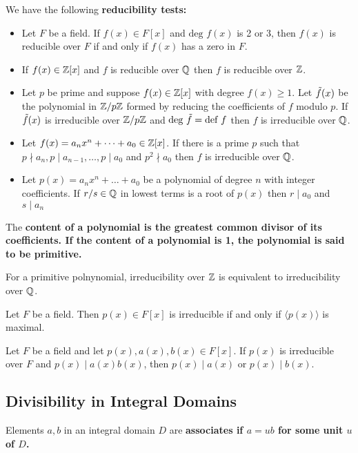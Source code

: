 \documentclass{hmwk}
\begin{document}
\begin{prop}
We have the following \bf{reducibility tests}:
\begin{itemize}
    \item Let $F$ be a field. If $f(x) \in F[x]$ and $\text{deg } f(x)$ is 2 or 3, then $f(x)$ is reducible over $F$ if and only if $f(x)$ has a zero in $F$.
    \item If $f(x) \in \mathbb{Z}[x]$ and $f$ is reducible over $\mathbb{Q}$ then $f$ is reducible over $\mathbb{Z}$.
    \item Let $p$ be prime and suppose $f(x) \in \mathbb{Z}[x]$ with degree $f(x) \geq 1$. Let $\Tilde{f}(x)$ be the polynomial in $\mathbb{Z}/p\mathbb{Z}$ formed by reducing the coefficients of $f$ modulo $p$. If $\Tilde{f}(x)$ is irreducible over $\mathbb{Z}/p\mathbb{Z}$ and $\text{deg }\Tilde{f} = \text{def }f$ then $f$ is irreducible over $\mathbb{Q}$.
    \item Let $f(x) = a_nx^n + \dots + a_0 \in \mathbb{Z}[x]$. If there is a prime $p$ such that $p \nmid a_n, p \mid a_{n-1}, \dots, p \mid a_0$ and $p^2 \nmid a_0$ then $f$ is irreducible over $\mathbb{Q}$. 
    \item Let $p(x) = a_nx^n + \dots + a_0$ be a polynomial of degree $n$ with integer coefficients. If $r/s \in \mathbb{Q}$ in lowest terms is a root of $p(x)$ then $r \mid a_0$ and $s \mid a_n$
\end{itemize}
\end{prop}

\begin{defn}
The \bf{content} of a polynomial is the greatest common divisor of its coefficients. If the content of a polynomial is 1, the polynomial is said to be primitive. 
\end{defn}

\begin{prop}
For a primitive polnynomial, irreducibility over $\mathbb{Z}$ is equivalent to irreducibility over $\mathbb{Q}$.
\end{prop}

\begin{prop}
Let $F$ be a field. Then $p(x) \in F[x]$ is irreducible if and only if $\langle p(x)\rangle$ is maximal. 
\end{prop}

\begin{prop}
Let $F$ be a field and let $p(x), a(x), b(x) \in F[x]$. If $p(x)$ is irreducible over $F$ and $p(x) \mid a(x)b(x)$, then $p(x) \mid a(x)$ or $p(x) \mid b(x)$.
\end{prop}

\subsection{Divisibility in Integral Domains}
\begin{defn}
Elements $a, b$ in an integral domain $D$ are \bf{associates} if $a = ub$ for some unit $u$ of $D$.
\end{defn}
\end{document}

